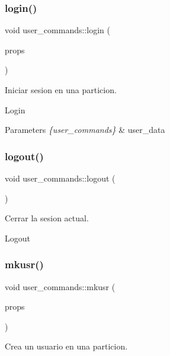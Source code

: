 \subsubsection{\texorpdfstring{login()}{login()}}
{\footnotesize\ttfamily void user\+\_\+commands\+::login (\begin{DoxyParamCaption}\item[{\hyperlink{structUserCommandsProps}{User\+Commands\+Props}}]{props }\end{DoxyParamCaption})}



Iniciar sesion en una particion. 

Login 
\begin{DoxyParams}{Parameters}
{\em \{user\+\_\+commands\}} & user\+\_\+data \\
\hline
\end{DoxyParams}
\mbox{\label{classuser__commands_a9f3307fd8aa6f788c0eddeb2166c5274}} 
\subsubsection{\texorpdfstring{logout()}{logout()}}
{\footnotesize\ttfamily void user\+\_\+commands\+::logout (\begin{DoxyParamCaption}{ }\end{DoxyParamCaption})}



Cerrar la sesion actual. 

Logout \mbox{\label{classuser__commands_a3465a40be3ffa4bf21758c1561b42fe5}} 
\subsubsection{\texorpdfstring{mkusr()}{mkusr()}}
{\footnotesize\ttfamily void user\+\_\+commands\+::mkusr (\begin{DoxyParamCaption}\item[{\hyperlink{structMkUserProps}{Mk\+User\+Props}}]{props }\end{DoxyParamCaption})}



Crea un usuario en una particion. 

